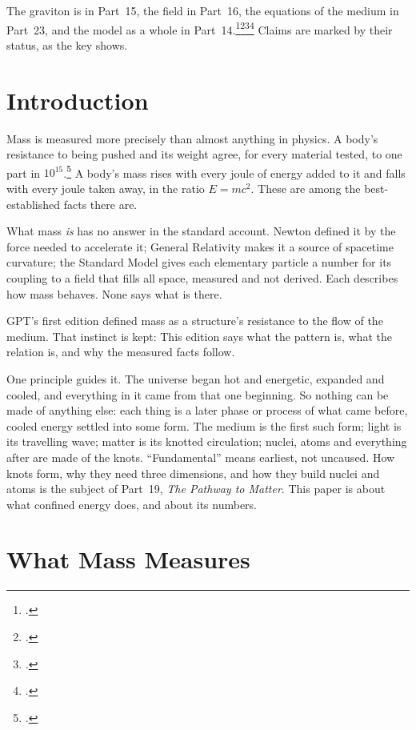 \documentclass[11pt,a4paper]{article}
\newcommand{\fn}[1]{\footnote{\citealp{#1}.}}
\begin{document}
The graviton is in Part~15, the field in Part~16, the equations of the medium in Part~23, and the model as a whole in Part~14.\fn{rashadaPart15}\fn{rashadaPart16}\fn{rashadaPart23}\fn{rashadaPart14} Claims are marked by their status, as the key shows.

\statuskey

\section*{Introduction}

Mass is measured more precisely than almost anything in physics. A body's resistance to being pushed and its weight agree, for every material tested, to one part in $10^{15}$.\fn{touboul2022} A body's mass rises with every joule of energy added to it and falls with every joule taken away, in the ratio $E = mc^2$. These are among the best-established facts there are.

What mass \emph{is} has no answer in the standard account. Newton defined it by the force needed to accelerate it; General Relativity makes it a source of spacetime curvature; the Standard Model gives each elementary particle a number for its coupling to a field that fills all space, measured and not derived. Each describes how mass behaves. None says what is there.

GPT's first edition defined mass as a structure's resistance to the flow of the medium. That instinct is kept:  This edition says what the pattern is, what the relation is, and why the measured facts follow.

One principle guides it. The universe began hot and energetic, expanded and cooled, and everything in it came from that one beginning. So nothing can be made of anything else: each thing is a later phase or process of what came before, cooled energy settled into some form. The medium is the first such form; light is its travelling wave; matter is its knotted circulation; nuclei, atoms and everything after are made of the knots. ``Fundamental'' means earliest, not uncaused. How knots form, why they need three dimensions, and how they build nuclei and atoms is the subject of Part~19, \emph{The Pathway to Matter}. This paper is about what confined energy does, and about its numbers.

\section{What Mass Measures}
\label{sec:measures}
\end{document}
